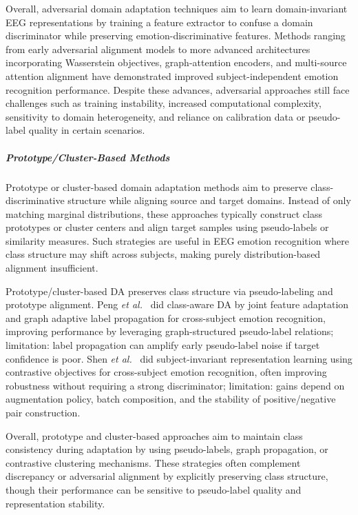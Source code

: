 \documentclass{WileyMSP-template}
\begin{document}
Overall, adversarial domain adaptation techniques aim to learn domain-invariant EEG representations by training a feature extractor to confuse a domain discriminator while preserving emotion-discriminative features. Methods ranging from early adversarial alignment models to more advanced architectures incorporating Wasserstein objectives, graph-attention encoders, and multi-source attention alignment have demonstrated improved subject-independent emotion recognition performance. Despite these advances, adversarial approaches still face challenges such as training instability, increased computational complexity, sensitivity to domain heterogeneity, and reliance on calibration data or pseudo-label quality in certain scenarios.

\subparagraph{Prototype/Cluster-Based Methods}
Prototype or cluster-based domain adaptation methods aim to preserve class-discriminative structure while aligning source and target domains. Instead of only matching marginal distributions, these approaches typically construct class prototypes or cluster centers and align target samples using pseudo-labels or similarity measures. Such strategies are useful in EEG emotion recognition where class structure may shift across subjects, making purely distribution-based alignment insufficient.

Prototype/cluster-based DA preserves class structure via pseudo-labeling and prototype alignment. Peng \textit{et al.}~\cite{peng2022jfaglp} did class-aware DA by joint feature adaptation and graph adaptive label propagation for cross-subject emotion recognition, improving performance by leveraging graph-structured pseudo-label relations; limitation: label propagation can amplify early pseudo-label noise if target confidence is poor. Shen \textit{et al.}~\cite{shen2022contrastive} did subject-invariant representation learning using contrastive objectives for cross-subject emotion recognition, often improving robustness without requiring a strong discriminator; limitation: gains depend on augmentation policy, batch composition, and the stability of positive/negative pair construction.

Overall, prototype and cluster-based approaches aim to maintain class consistency during adaptation by using pseudo-labels, graph propagation, or contrastive clustering mechanisms. These strategies often complement discrepancy or adversarial alignment by explicitly preserving class structure, though their performance can be sensitive to pseudo-label quality and representation stability.
\end{document}
